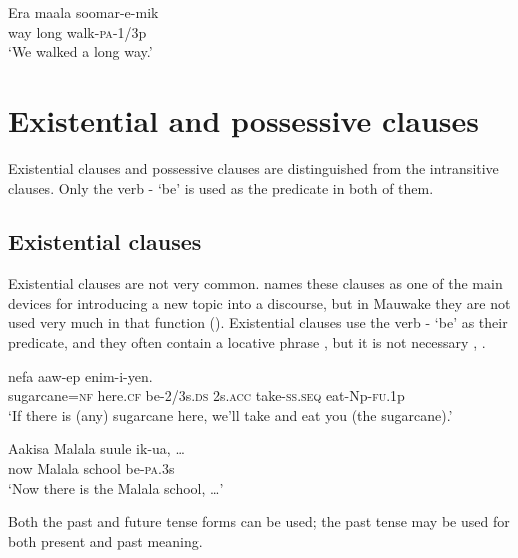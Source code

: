\ea%
\label{ex:5:x307}
\gll Era  maala  soomar-e-mik \\
     way  long  walk-\textsc{pa}-1/3p \\
\glt `We walked a long way.'
\z

\section{Existential and possessive clauses}

Existential clauses and possessive clauses are distinguished from the intransitive clauses. Only the verb - `be' is used as the predicate in both of them. 

\subsection{Existential clauses} \label{sec:5.5.1}

Existential clauses are not very common. \citet[741]{Givon1990} names these clauses as one of the main devices for introducing a new topic into a discourse, but in Mauwake they are not used very much in that function (). Existential clauses use the verb - `be' as their predicate, and they often contain a locative phrase , but it is not necessary , . 

\ea%
\label{ex:5:x970}
\gll {}     nefa  aaw-ep  enim-i-yen. \\
     sugarcane=\textsc{nf}  here.\textsc{cf}  be-2/3s.\textsc{ds}  2s.\textsc{acc}  take-\textsc{ss}.\textsc{seq}  eat-Np-\textsc{fu}.1p \\
\glt `If there is (any) sugarcane here, we'll take and eat you (the sugarcane).'
\z

\ea%
\label{ex:5:x971}
\gll Aakisa  Malala  suule  ik-ua,  {\dots} \\
     now  Malala  school  be-\textsc{pa}.3s \\
\glt `Now there is the Malala school, {\dots}'
\z

Both the past and future tense forms can be used; the past tense may be used for both present and past meaning. 

